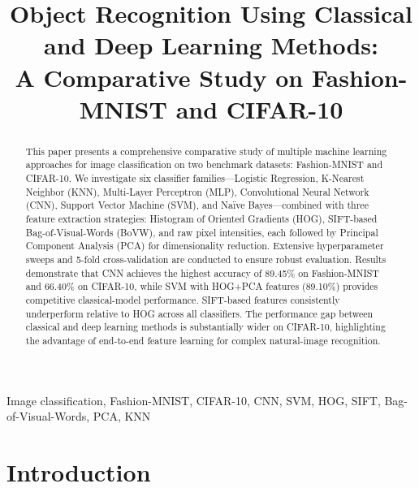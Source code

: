 \documentclass[conference]{IEEEtran}
\begin{document}
\title{Object Recognition Using Classical and Deep Learning Methods:\\
A Comparative Study on Fashion-MNIST and CIFAR-10}

\author{
}

\maketitle

\begin{abstract}
This paper presents a comprehensive comparative study of multiple machine learning approaches for image classification on two benchmark datasets: Fashion-MNIST and CIFAR-10. We investigate six classifier families—Logistic Regression, K-Nearest Neighbor (KNN), Multi-Layer Perceptron (MLP), Convolutional Neural Network (CNN), Support Vector Machine (SVM), and Naïve Bayes—combined with three feature extraction strategies: Histogram of Oriented Gradients (HOG), SIFT-based Bag-of-Visual-Words (BoVW), and raw pixel intensities, each followed by Principal Component Analysis (PCA) for dimensionality reduction. Extensive hyperparameter sweeps and 5-fold cross-validation are conducted to ensure robust evaluation. Results demonstrate that CNN achieves the highest accuracy of 89.45\% on Fashion-MNIST and 66.40\% on CIFAR-10, while SVM with HOG+PCA features (89.10\%) provides competitive classical-model performance. SIFT-based features consistently underperform relative to HOG across all classifiers. The performance gap between classical and deep learning methods is substantially wider on CIFAR-10, highlighting the advantage of end-to-end feature learning for complex natural-image recognition.
\end{abstract}

\begin{IEEEkeywords}
Image classification, Fashion-MNIST, CIFAR-10, CNN, SVM, HOG, SIFT, Bag-of-Visual-Words, PCA, KNN
\end{IEEEkeywords}

\section{Introduction}
\end{document}
